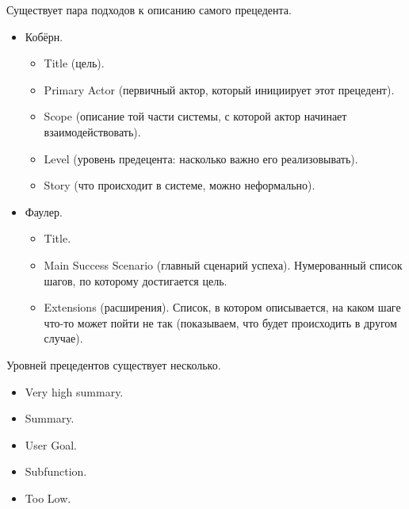     \begin{Def}
        Существует пара подходов к описанию самого прецедента.

        \begin{itemize}
            \item Кобёрн.
            \begin{itemize}
                \item Title (цель).
                \item Primary Actor (первичный актор, который инициирует этот прецедент).
                \item Scope (описание той части системы, с которой актор начинает взаимодействовать).
                \item Level (уровень предецента: 
                насколько важно его реализовывать).
                \item Story (что происходит в системе, можно неформально).
            \end{itemize}
            
            \item Фаулер.
            \begin{itemize}
                \item Title.
                \item Main Success Scenario (главный сценарий успеха). Нумерованный список шагов, по которому достигается цель.
                \item Extensions (расширения). Список, в котором описывается, на каком шаге что-то может пойти не так (показываем, что будет происходить в другом случае).
            \end{itemize}
        \end{itemize}
    \end{Def}

    \begin{Rem}
        Уровней прецедентов существует несколько.
        \begin{itemize}
            \item Very high summary.
            \item Summary.
            \item User Goal.
            \item Subfunction.
            \item Too Low.
        \end{itemize}
    \end{Rem}


